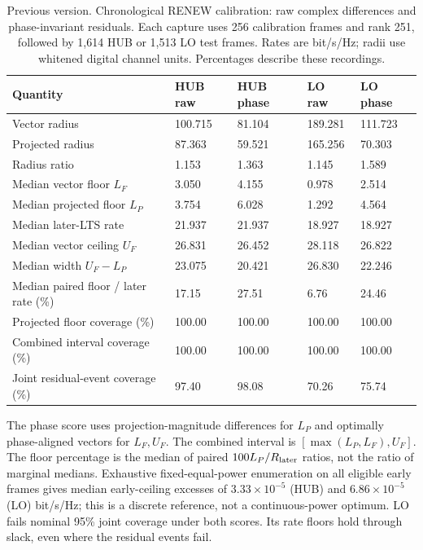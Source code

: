 \documentclass[10pt,letterpaper]{article}
\begin{document}
\begin{table}[p]\color{red}\centering\small
\setlength{\tabcolsep}{4pt}
\caption*{Previous version. Chronological RENEW calibration: raw complex differences and phase-invariant residuals. Each capture uses 256 calibration frames and rank 251, followed by 1,614 HUB or 1,513 LO test frames. Rates are bit/s/Hz; radii use whitened digital channel units. Percentages describe these recordings.}
\begin{tabular}{lllll}\toprule
Quantity & HUB raw & HUB phase & LO raw & LO phase\\
\midrule
Vector radius & 100.715 & 81.104 & 189.281 & 111.723\\
Projected radius & 87.363 & 59.521 & 165.256 & 70.303\\
Radius ratio & 1.153 & 1.363 & 1.145 & 1.589\\
Median vector floor $L_F$ & 3.050 & 4.155 & 0.978 & 2.514\\
Median projected floor $L_P$ & 3.754 & 6.028 & 1.292 & 4.564\\
Median later-LTS rate & 21.937 & 21.937 & 18.927 & 18.927\\
Median vector ceiling $U_F$ & 26.831 & 26.452 & 28.118 & 26.822\\
Median width $U_F-L_P$ & 23.075 & 20.421 & 26.830 & 22.246\\
Median paired floor / later rate (\%) & 17.15 & 27.51 & 6.76 & 24.46\\
Projected floor coverage (\%) & 100.00 & 100.00 & 100.00 & 100.00\\
Combined interval coverage (\%) & 100.00 & 100.00 & 100.00 & 100.00\\
Joint residual-event coverage (\%) & 97.40 & 98.08 & 70.26 & 75.74\\
\bottomrule\end{tabular}
\par\medskip\begin{minipage}{\linewidth}\small
The phase score uses projection-magnitude differences for $L_P$ and optimally phase-aligned vectors for $L_F,U_F$. The combined interval is $[\max(L_P,L_F),U_F]$. The floor percentage is the median of paired $100L_P/R_{\rm later}$ ratios, not the ratio of marginal medians. Exhaustive fixed-equal-power enumeration on all eligible early frames gives median early-ceiling excesses of $3.33\times10^{-5}$ (HUB) and $6.86\times10^{-5}$ (LO) bit/s/Hz; this is a discrete reference, not a continuous-power optimum. LO fails nominal 95\% joint coverage under both scores. Its rate floors hold through slack, even where the residual events fail.
\end{minipage}
\end{table}
\end{document}
